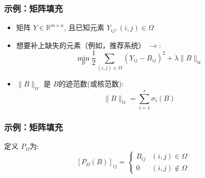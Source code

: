 \documentclass[handout]{beamer}
\begin{document}
\begin{frame}

\frametitle{示例：矩阵填充}


\begin{itemize}
	\item 
矩阵 $Y \in \mathbb{R}^{m \times n}$, 且已知元素 $Y_{i j},(i, j) \in \Omega $


 
\item	想要补上缺失的元素（例如，推荐系统） $\rightarrow$:
\begin{equation}
\min _{B} \frac{1}{2} \sum_{(i, j) \in \Omega}\left(Y_{i j}-B_{i j}\right)^{2}+\lambda\|B\|_{\operatorname{tr}}
\end{equation}

\item  $\|B\|_{\mathrm{tr}}$ 是 $B$的迹范数(或核范数):
\begin{equation}
\|B\|_{\mathrm{tr}}=\sum_{i=1}^{r} \sigma_{i}(B)
\end{equation}


\end{itemize}
\end{frame}
\begin{frame}

\frametitle{示例：矩阵填充}

定义 $P_{\Omega}$为:
\begin{equation}
\left[P_{\Omega}(B)\right]_{i j}=\left\{\begin{array}{ll}
B_{i j} & (i, j) \in \Omega \\
0 & (i, j) \notin \Omega
\end{array}\right.
\end{equation}

\end{frame}
\end{document}
